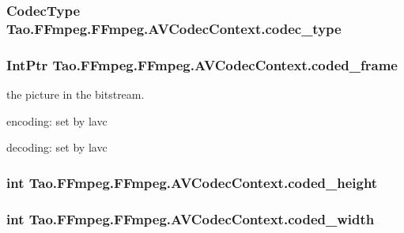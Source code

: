 \label{struct_tao_1_1_f_fmpeg_1_1_f_fmpeg_1_1_a_v_codec_context_aba8d4eed4223e45465f75037f66ce477}
\hypertarget{struct_tao_1_1_f_fmpeg_1_1_f_fmpeg_1_1_a_v_codec_context_ae8a0b285689496d93f8b4d0d2783bf36}{
\subsubsection[{codec\_\-type}]{\setlength{\rightskip}{0pt plus 5cm}CodecType {\bf Tao.FFmpeg.FFmpeg.AVCodecContext.codec\_\-type}}}
\label{struct_tao_1_1_f_fmpeg_1_1_f_fmpeg_1_1_a_v_codec_context_ae8a0b285689496d93f8b4d0d2783bf36}
\hypertarget{struct_tao_1_1_f_fmpeg_1_1_f_fmpeg_1_1_a_v_codec_context_af95abb0c53f761a8f59e43ac222aa270}{
\subsubsection[{coded\_\-frame}]{\setlength{\rightskip}{0pt plus 5cm}IntPtr {\bf Tao.FFmpeg.FFmpeg.AVCodecContext.coded\_\-frame}}}
\label{struct_tao_1_1_f_fmpeg_1_1_f_fmpeg_1_1_a_v_codec_context_af95abb0c53f761a8f59e43ac222aa270}
the picture in the bitstream.
\begin{DoxyItemize}
\item encoding: set by lavc
\item decoding: set by lavc 
\end{DoxyItemize}\hypertarget{struct_tao_1_1_f_fmpeg_1_1_f_fmpeg_1_1_a_v_codec_context_a6796a6bc177530c05f5e0599c3423464}{
\subsubsection[{coded\_\-height}]{\setlength{\rightskip}{0pt plus 5cm}int {\bf Tao.FFmpeg.FFmpeg.AVCodecContext.coded\_\-height}}}
\label{struct_tao_1_1_f_fmpeg_1_1_f_fmpeg_1_1_a_v_codec_context_a6796a6bc177530c05f5e0599c3423464}
\hypertarget{struct_tao_1_1_f_fmpeg_1_1_f_fmpeg_1_1_a_v_codec_context_a461b1a630112ab3e27e22ab2dc11aefc}{
\subsubsection[{coded\_\-width}]{\setlength{\rightskip}{0pt plus 5cm}int {\bf Tao.FFmpeg.FFmpeg.AVCodecContext.coded\_\-width}}}
